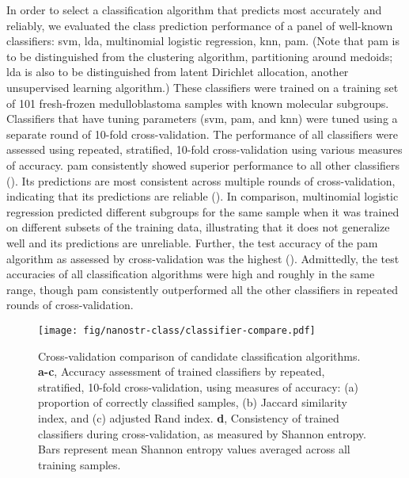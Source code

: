In order to select a classification algorithm that predicts most accurately and reliably, we evaluated the class prediction performance of a panel of well-known classifiers: \gls{svm}, \gls{lda}, multinomial logistic regression, \gls{knn}, \gls{pam}. (Note that \gls{pam} is to be distinguished from the clustering algorithm, partitioning around medoids; \gls{lda} is also to be distinguished from latent Dirichlet allocation, another unsupervised learning algorithm.) These classifiers were trained on a training set of 101 fresh-frozen medulloblastoma samples with known molecular subgroups. Classifiers that have tuning parameters (\gls{svm}, \gls{pam}, and \gls{knn}) were tuned using a separate round of 10-fold cross-validation. The performance of all classifiers were assessed using repeated, stratified, 10-fold cross-validation using various measures of accuracy. \gls{pam} consistently showed superior performance to all other classifiers (). Its predictions are most consistent across multiple rounds of cross-validation, indicating that its predictions are reliable (). In comparison, multinomial logistic regression predicted different subgroups for the same sample when it was trained on different subsets of the training data, illustrating that it does not generalize well and its predictions are unreliable. Further, the test accuracy of the \gls{pam} algorithm as assessed by cross-validation was the highest (). Admittedly, the test accuracies of all classification algorithms were high and roughly in the same range, though \gls{pam} consistently outperformed all the other classifiers in repeated rounds of cross-validation.

\begin{figure}[hb]
	\begin{center}
		\texttt{[image: fig/nanostr-class/classifier-compare.pdf]}
	\end{center}
	\caption[Cross-validation comparison of candidate classification algorithms]
	{
		Cross-validation comparison of candidate classification algorithms.
		\textbf{a-c}, Accuracy assessment of trained classifiers by repeated, stratified, 10-fold cross-validation, using measures of accuracy: (a) proportion of correctly classified samples, (b) Jaccard similarity index, and (c) adjusted Rand index.
		\textbf{d}, Consistency of trained classifiers during cross-validation, as measured by Shannon entropy. Bars represent mean Shannon entropy values averaged across all training samples.
	}
	\label{fig:classifier-compare}
\end{figure}

